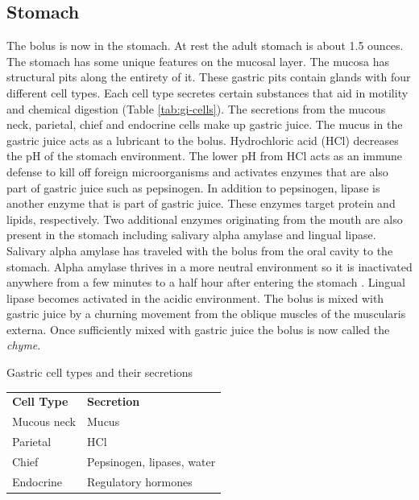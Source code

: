 \documentclass{tufte-handout}
\begin{document}
\subsection{Stomach}
The bolus is now in the stomach. At rest the adult stomach is about 1.5 ounces. The stomach has some unique features on the mucosal layer. The mucosa has structural pits along the entirety of it. These gastric pits contain glands with four different cell types. Each cell type secretes certain substances that aid in motility and chemical digestion (Table \ref{tab:gi-cells}). The secretions from the mucous neck, parietal, chief and endocrine cells make up gastric juice. The mucus in the gastric juice acts as a lubricant to the bolus. Hydrochloric acid (HCl) decreases the pH of the stomach environment. The lower pH from HCl acts as an immune defense to kill off foreign microorganisms and activates enzymes that are also part of gastric juice such as pepsinogen. In addition to pepsinogen, lipase is another enzyme that is part of gastric juice. These enzymes target protein and lipids, respectively. Two additional enzymes originating from the mouth are also present in the stomach including salivary alpha amylase and lingual lipase. Salivary alpha amylase has traveled with the bolus from the oral cavity to the stomach. Alpha amylase thrives in a more neutral environment so it is inactivated anywhere from a few minutes to a half hour after entering the stomach \citep{Rohleder2009}. Lingual lipase becomes activated in the acidic environment. The bolus is mixed with gastric juice by a churning movement from the oblique muscles of the muscularis externa. Once sufficiently mixed with gastric juice the bolus is now called the \emph{chyme}. 

\begin{margintable}
\caption{Gastric cell types and their secretions}
\label{tab:gi-cells}
\begin{tabular}{ll}
\textbf{Cell Type} & \textbf{Secretion} \\
Mucous neck	 & Mucus                     \\
Parietal & HCl             \\
Chief & Pepsinogen, lipases, water \\
Endocrine & Regulatory hormones                    
\end{tabular}
\end{margintable}
\end{document}
